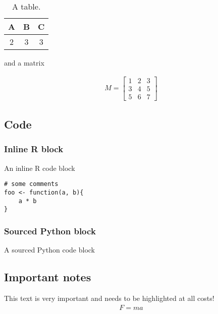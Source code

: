\documentclass[11pt,a4paper]{article}
\begin{document}
\begin{table}[!htb]
\centering
\begin{tabular}{| c | c | c |}
\hline
A & B & C \\\hline
2 & 3 & 3 \\\hline
\end{tabular}
\caption{%
A table.
}
\label{tab:data}
\end{table}

and a matrix

\begin{align}
M =
\begin{bmatrix}
1 & 2 & 3 \\
3 & 4 & 5 \\
5 & 6 & 7
\end{bmatrix}
\end{align}

\subsection{Code}

\subsubsection{Inline R block}

An inline R code block

\begin{verbatim}
# some comments
foo <- function(a, b){
    a * b
}
\end{verbatim}

\subsubsection{Sourced Python block}

A sourced Python code block



\subsection{Important notes}

\begin{important}
This text is very important and needs to be highlighted
at all costs!
\begin{align}
F = ma
\end{align}
\end{important}

\clearpage
\end{document}
